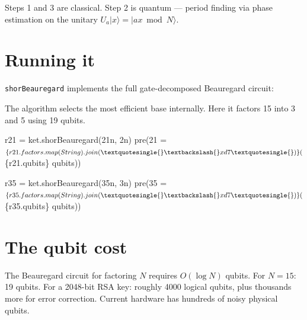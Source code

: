 \documentclass[
  11pt,
  letterpaper,
  oneside]{scrbook}
\newenvironment{Shaded}{\begin{snugshade}}{\end{snugshade}}
\newcommand{\NormalTok}[1]{\textcolor[rgb]{0.00,0.23,0.31}{#1}}
\begin{document}
Steps 1 and 3 are classical. Step 2 is quantum --- period finding via
phase estimation on the unitary \(U_a|x\rangle = |ax \bmod N\rangle\).

\section{Running it}\label{running-it}

\texttt{shorBeauregard} implements the full gate-decomposed Beauregard
circuit:

\begin{Shaded}
\end{Shaded}

The algorithm selects the most efficient base internally. Here it
factors 15 into 3 and 5 using 19 qubits.

\begin{Shaded}
\begin{Highlighting}[]
\NormalTok{r21 = ket.shorBeauregard(21n, 2n)}
\NormalTok{pre(\textasciigrave{}21 = $\{r21.factors.map(String).join(\textquotesingle{} \textbackslash{}xd7 \textquotesingle{})\}  ($\{r21.qubits\} qubits)\textasciigrave{})}
\end{Highlighting}
\end{Shaded}

\begin{Shaded}
\begin{Highlighting}[]
\NormalTok{r35 = ket.shorBeauregard(35n, 3n)}
\NormalTok{pre(\textasciigrave{}35 = $\{r35.factors.map(String).join(\textquotesingle{} \textbackslash{}xd7 \textquotesingle{})\}  ($\{r35.qubits\} qubits)\textasciigrave{})}
\end{Highlighting}
\end{Shaded}

\section{The qubit cost}\label{the-qubit-cost}

The Beauregard circuit for factoring \(N\) requires \(O(\log N)\)
qubits. For \(N=15\): 19 qubits. For a 2048-bit RSA key: roughly 4000
logical qubits, plus thousands more for error correction. Current
hardware has hundreds of noisy physical qubits.
\end{document}
